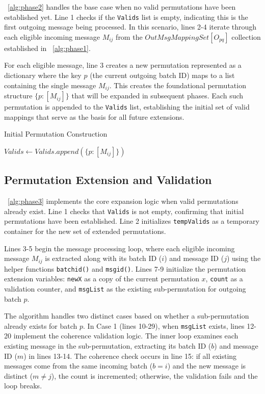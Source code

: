 \documentclass{article}
\begin{document}
~\ref{alg:phase2} handles the base case 
when no valid permutations have been established 
yet. Line 1 checks if the \texttt{Valids} list 
is empty, indicating this is the first outgoing 
message being processed. In this scenario, 
lines 2-4 iterate through each eligible incoming 
message $M_{ij}$ from the $OutMsgMappingSet[O_{pq}]$
collection established in ~\ref{alg:phase1}.

For each eligible message, line 3 creates a new 
permutation represented as a dictionary where 
the key $p$ (the current outgoing batch ID) 
maps to a list containing the single 
message $M_{ij}$. This creates the foundational 
permutation structure $\{p: [M_{ij}]\}$ that will 
be expanded in subsequent phases. Each such 
permutation is appended to the \texttt{Valids} 
list, establishing the initial set of valid 
mappings that serve as the basis for all future 
extensions.


\begin{algorithm}[H]
\caption{Initial Permutation Construction}
\label{alg:phase2}
\begin{algorithmic}[1]
        \State $Valids \gets Valids.append(\{ p: [M_{ij}] \} )$
    \EndFor
\EndIf
\end{algorithmic}
\end{algorithm}

\subsection{Permutation Extension and Validation}

~\ref{alg:phase3} implements the core 
expansion logic when valid permutations 
already exist. Line 1 checks that 
\texttt{Valids} is not empty, confirming 
that initial permutations have been established. 
Line 2 initializes \texttt{tempValids} as a 
temporary container for the new set of 
extended permutations.

Lines 3-5 begin the message processing 
loop, where each eligible incoming 
message $M_{ij}$ is extracted along 
with its batch ID ($i$) and message ID ($j$) 
using the helper functions \texttt{batchid()} 
and \texttt{msgid()}. Lines 7-9 initialize 
the permutation extension variables: \texttt{newX} 
as a copy of the current permutation $x$, \texttt{count} 
as a validation counter, and \texttt{msgList} 
as the existing sub-permutation for outgoing 
batch $p$.

The algorithm handles two distinct cases 
based on whether a sub-permutation already 
exists for batch $p$. In Case 1 (lines 10-29), 
when \texttt{msgList} exists, lines 12-20 
implement the coherence validation logic. 
The inner loop examines each 
existing message in the sub-permutation, 
extracting its batch ID ($b$) and message ID ($m$) 
in lines 13-14. The coherence 
check occurs in line 15: if all existing 
messages come from the same incoming 
batch ($b = i$) and the new message is 
distinct ($m \neq j$), the count is 
incremented; otherwise, the validation 
fails and the loop breaks.
\end{document}
